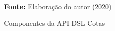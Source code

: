 \begin{figure}[ht!]
\centering

\caption{\textmd{Componentes da API DSL Cotas}}
\label{fig:apicomponentes}

\par\medskip\textbf{Fonte:} Elaboração do autor (2020) \par\medskip

\end{figure}

